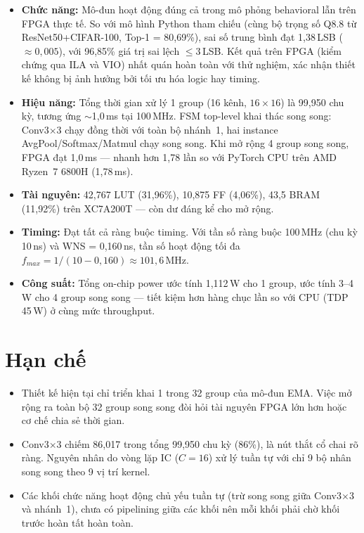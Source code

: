 \documentclass{uetgraduation}
\begin{document}
\begin{itemize}
    \item \textbf{Chức năng:} Mô-đun hoạt động đúng cả trong mô phỏng behavioral lẫn
    trên FPGA thực tế. So với mô hình Python tham chiếu (cùng bộ trọng số Q8.8 từ
    ResNet50+CIFAR-100, Top-1 = 80{,}69\%), sai số trung bình đạt 1{,}38\,LSB
    ($\approx 0{,}005$), với 96{,}85\% giá trị sai lệch $\leq 3$\,LSB. Kết quả
    trên FPGA (kiểm chứng qua ILA và VIO) nhất quán hoàn toàn với thử nghiệm, xác nhận
    thiết kế không bị ảnh hưởng bởi tối ưu hóa logic hay timing.

    \item \textbf{Hiệu năng:} Tổng thời gian xử lý 1 group (16 kênh, $16 \times 16$)
    là 99{,}950 chu kỳ, tương ứng $\sim$1{,}0\,ms tại 100\,MHz. FSM top-level khai
    thác song song: Conv3$\times$3 chạy đồng thời với toàn bộ nhánh~1, hai instance
    AvgPool/Softmax/Matmul chạy song song. Khi mở rộng 4 group song song, FPGA đạt
    1{,}0\,ms --- nhanh hơn 1{,}78 lần so với PyTorch CPU trên AMD Ryzen~7 6800H
    (1{,}78\,ms).

    \item \textbf{Tài nguyên:} 42{,}767 LUT (31{,}96\%), 10{,}875 FF (4{,}06\%),
    43{,}5 BRAM (11{,}92\%) trên XC7A200T --- còn dư đáng kể cho mở rộng.

    \item \textbf{Timing:} Đạt tất cả ràng buộc timing. Với tần số ràng buộc 100\,MHz (chu kỳ 10\,ns) và WNS = 0{,}160\,ns, tần số hoạt động tối đa $f_{max} = 1/(10 - 0{,}160) \approx 101{,}6$\,MHz.

    \item \textbf{Công suất:} Tổng on-chip power ước tính 1{,}112\,W cho 1 group,
    ước tính 3--4\,W cho 4 group song song --- tiết kiệm hơn hàng chục lần so với
    CPU (TDP 45\,W) ở cùng mức throughput.
\end{itemize}

\section{Hạn chế}

\begin{itemize}
    \item Thiết kế hiện tại chỉ triển khai 1 trong 32 group của mô-đun EMA. Việc mở
    rộng ra toàn bộ 32 group song song đòi hỏi tài nguyên FPGA lớn hơn hoặc cơ chế
    chia sẻ thời gian.

    \item Conv3$\times$3 chiếm 86{,}017 trong tổng 99{,}950 chu kỳ (86\%), là nút
    thắt cổ chai rõ ràng. Nguyên nhân do vòng lặp IC ($C = 16$) xử lý tuần tự với
    chỉ 9 bộ nhân song song theo 9 vị trí kernel.

    \item Các khối chức năng hoạt động chủ yếu tuần tự (trừ song song giữa
    Conv3$\times$3 và nhánh~1), chưa có pipelining giữa các khối nên mỗi khối phải
    chờ khối trước hoàn tất hoàn toàn.
\end{itemize}
\end{document}
